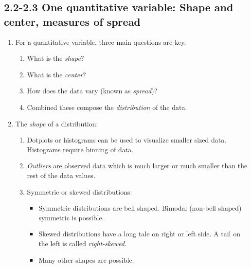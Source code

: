 \documentclass{article}
\begin{document}
\subsection{2.2-2.3 One quantitative variable: Shape and center, measures of spread}

\begin{enumerate}

\item For a quantitative variable, three main questions are key.
\begin{enumerate}
\item What is the \emph{shape}?
\item What is the \emph{center}?
\item How does the data vary (known as \emph{spread})?
\item Combined these compose the \emph{distribution} of the data.
\end{enumerate}

\item The \emph{shape} of a distribution:
\begin{enumerate}
\item Dotplots or histograms can be used to visualize smaller sized data. Histograms require binning of data.
\item \emph{Outliers} are observed data which is much larger or much smaller than the rest of the data values.
\item Symmetric or skewed distributions:
\begin{itemize}
\item Symmetric distributions are bell shaped. Bimodal (non-bell shaped) symmetric is possible.
\item Skewed distributions have a long tale on right or left side. A tail on the left is called \emph{right-skewed}.
\item Many other shapes are possible.
\end{itemize}
\end{enumerate}


\end{enumerate}
\end{document}

